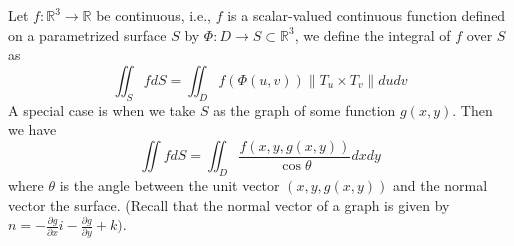 \documentclass[openany]{book}
\newcommand{\R}{\mathbb{R}}
\begin{document}
\begin{defn}
    Let $f:\R^3\to\R$ be continuous, i.e., $f$ is a scalar-valued continuous function defined on a parametrized surface $S$ by $\Phi:D\to S\subset\R^3$, we define the integral of $f$ over $S$ as 
    \begin{equation*}
        \iint_SfdS=\iint_Df(\Phi(u,v))\|T_u\times T_v\|dudv
    \end{equation*}
    A special case is when we take $S$ as the graph of some function $g(x,y)$. Then we have 
    \begin{equation*}
        \iint fdS=\iint_D\frac{f(x,y,g(x,y))}{\cos\theta}dxdy
    \end{equation*}
    where $\theta$ is the angle between the unit vector $(x,y,g(x,y))$ and the normal vector the surface. (Recall that the normal vector of a graph is given by $n=-\frac{\partial g}{\partial x}i-\frac{\partial g}{\partial y}+k)$.
\end{defn}






   
\end{document}
